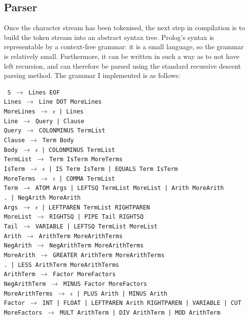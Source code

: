 \documentclass[12pt]{article}
\begin{document}
\subsection{Parser}

Once the character stream has been tokenised, the next step in compilation is to build the token stream into an abstract syntax tree. 
Prolog's syntax is representable by a context-free grammar: it is a small language, so the grammar is relatively small. 
Furthermore, it can be written in such a way as to not have left recursion, and can therefore be parsed using the standard recursive descent parsing method. 
The grammar I implemented is as follows:

\newpage

\texttt{
S $\rightarrow$ Lines EOF\\
Lines $\rightarrow$ Line DOT MoreLines\\
MoreLines $\rightarrow$ $\epsilon$ | Lines\\
Line $\rightarrow$ Query | Clause\\
Query $\rightarrow$ COLONMINUS TermList\\
Clause $\rightarrow$ Term Body\\
Body $\rightarrow$ $\epsilon$ | COLONMINUS TermList\\
TermList $\rightarrow$ Term IsTerm MoreTerms\\
IsTerm $\rightarrow$ $\epsilon$ | IS Term IsTerm | EQUALS Term IsTerm\\
MoreTerms $\rightarrow$ $\epsilon$ | COMMA TermList\\
Term $\rightarrow$ ATOM Args | LEFTSQ TermList MoreList | Arith MoreArith\\
.\hspace{20px} | NegArith MoreArith \\
Args $\rightarrow$ $\epsilon$ | LEFTPAREN TermList RIGHTPAREN\\
MoreList $\rightarrow$ RIGHTSQ | PIPE Tail RIGHTSQ\\
Tail $\rightarrow$ VARIABLE | LEFTSQ TermList MoreList\\
Arith $\rightarrow$ ArithTerm MoreArithTerms\\
NegArith $\rightarrow$ NegArithTerm MoreArithTerms\\
MoreArith $\rightarrow$ GREATER ArithTerm MoreArithTerms\\
.\hspace{50px} | LESS ArithTerm MoreArithTerms \\
ArithTerm $\rightarrow$ Factor MoreFactors\\
NegArithTerm $\rightarrow$ MINUS Factor MoreFactors\\
MoreArithTerms $\rightarrow$ $\epsilon$ | PLUS Arith | MINUS Arith\\
Factor $\rightarrow$ INT | FLOAT | LEFTPAREN Arith RIGHTPAREN | VARIABLE | CUT\\
MoreFactors $\rightarrow$ MULT ArithTerm | DIV ArithTerm | MOD ArithTerm
}
\end{document}
